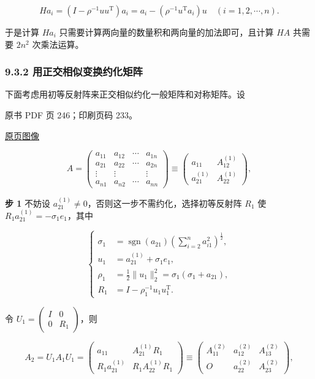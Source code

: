 \[
Ha_i=(I-\rho^{-1}uu^{\mathrm T})a_i=a_i-(\rho^{-1}u^{\mathrm T}a_i)u\quad(i=1,2,\cdots,n).
\]

于是计算 \(Ha_i\) 只需要计算两向量的数量积和两向量的加法即可，且计算 \(HA\) 共需要 \(2n^2\) 次乘法运算。

\subsubsection{9.3.2 用正交相似变换约化矩阵}\label{ch09a-ux7528ux6b63ux4ea4ux76f8ux4f3cux53d8ux6362ux7ea6ux5316ux77e9ux9635}

下面考虑用初等反射阵来正交相似约化一般矩阵和对称矩阵。设

\clearpage

原书 PDF 页 246；印刷页码 233。

\href{source-images/pdf-246.jpeg}{原页图像}

\[
A=\left(\begin{array}{c|ccc}
a_{11}&a_{12}&\cdots&a_{1n}\\\hline
a_{21}&a_{22}&\cdots&a_{2n}\\
\vdots&\vdots&&\vdots\\
a_{n1}&a_{n2}&\cdots&a_{nn}
\end{array}\right)
\equiv\begin{pmatrix}
a_{11}&A_{12}^{(1)}\\
a_{21}^{(1)}&A_{22}^{(1)}
\end{pmatrix},
\]

\textbf{步 1} 不妨设 \(a_{21}^{(1)}\ne0\)，否则这一步不需约化，选择初等反射阵 \(R_1\) 使 \(R_1a_{21}^{(1)}=-\sigma_1e_1\)，其中

\[
\left\{
\begin{aligned}
\sigma_1&=\operatorname{sgn}(a_{21})\left(\sum_{i=2}^na_{i1}^2\right)^{\frac12},\\
u_1&=a_{21}^{(1)}+\sigma_1e_1,\\
\rho_1&=\frac12\|u_1\|_2^2=\sigma_1(\sigma_1+a_{21}),\\
R_1&=I-\rho_1^{-1}u_1u_1^{\mathrm T}.
\end{aligned}
\right.
\tag{9.3.1}
\]

令 \(U_1=\begin{pmatrix}I&0\\0&R_1\end{pmatrix}\)，则

\[
A_2=U_1A_1U_1=\begin{pmatrix}
a_{11}&A_{21}^{(1)}R_1\\
R_1a_{21}^{(1)}&R_1A_{22}^{(1)}R_1
\end{pmatrix}
\equiv\begin{pmatrix}
A_{11}^{(2)}&a_{12}^{(2)}&A_{13}^{(2)}\\
O&a_{22}^{(2)}&A_{23}^{(2)}
\end{pmatrix},
\]

